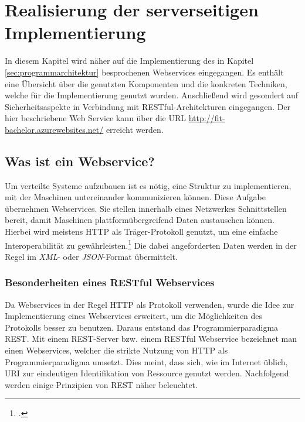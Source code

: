 \chapter{Realisierung der serverseitigen Implementierung}
\label{cha:server-impl}
In diesem Kapitel wird näher auf die Implementierung des in Kapitel \ref{sec:programmarchitektur} besprochenen Webservices eingegangen. Es enthält eine Übersicht über die genutzten Komponenten und die konkreten Techniken, welche für die Implementierung genutzt wurden. Anschließend wird gesondert auf Sicherheitsaspekte in Verbindung mit \ac{REST}ful-Architekturen eingegangen. Der hier beschriebene Web Service kann über die \ac{URL} \href{http://fit-bachelor.azurewebsites.net/}{http://fit-bachelor.azurewebsites.net/} erreicht werden. 
\section{Was ist ein Webservice?}
\label{sec:definition-webservice}
Um verteilte Systeme aufzubauen ist es nötig, eine Struktur zu implementieren, mit der Maschinen untereinander kommunizieren können. Diese Aufgabe übernehmen Webservices. Sie stellen innerhalb eines Netzwerkes Schnittstellen bereit, damit Maschinen plattformübergreifend Daten austauschen können. Hierbei wird meistens \ac{HTTP} als Träger-Protokoll genutzt, um eine einfache Interoperabilität zu gewährleisten.\footcite{Definition-Webservice} Die dabei angeforderten Daten werden in der Regel im \textit{\ac{XML}}- oder \textit{\ac{JSON}}-Format übermittelt. 
\subsection{Besonderheiten eines RESTful Webservices}
\label{sec:definition-rest}
Da Webservices in der Regel \ac{HTTP} als Protokoll verwenden, wurde die Idee zur Implementierung eines Webservices erweitert, um die Möglichkeiten des Protokolls besser zu benutzen. Daraus entstand das Programmierparadigma \ac{REST}. Mit einem \ac{REST}-Server bzw. einem \ac{REST}ful Webservice bezeichnet man einen Webservices, welcher die strikte Nutzung von \ac{HTTP} als Programmierparadigma umsetzt.  Dies meint, dass sich, wie im Internet üblich, \ac{URI} zur eindeutigen Identifikation von Ressource genutzt werden. Nachfolgend werden einige Prinzipien von \ac{REST} näher beleuchtet.


